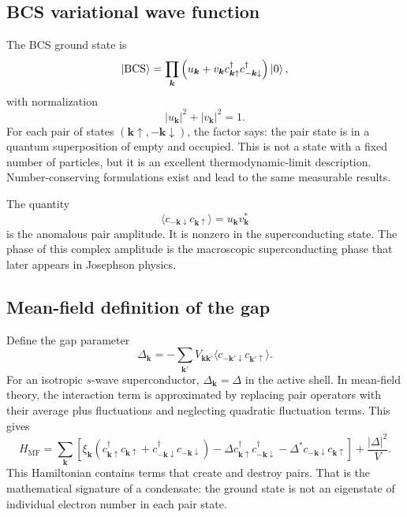 \documentclass[11pt]{article}
\newcommand{\bk}{{\bm{k}}}
\begin{document}
\subsection{BCS variational wave function}
The BCS ground state is
\begin{equation}
\ket{\mathrm{BCS}}=\prod_{\bk}\left(u_\bk+v_\bk c_{\bk\uparrow}^{\dagger}c_{-\bk\downarrow}^{\dagger}\right)\ket{0},
\end{equation}
with normalization
\begin{equation}
 |u_\bk|^2+|v_\bk|^2=1.
\end{equation}
For each pair of states $(\bk\uparrow,-\bk\downarrow)$, the factor says: the pair state is in a quantum superposition of empty and occupied. This is not a state with a fixed number of particles, but it is an excellent thermodynamic-limit description. Number-conserving formulations exist and lead to the same measurable results.

The quantity
\begin{equation}
 \langle c_{-\bk\downarrow}c_{\bk\uparrow}\rangle=u_\bk v_\bk^*
\end{equation}
is the anomalous pair amplitude. It is nonzero in the superconducting state. The phase of this complex amplitude is the macroscopic superconducting phase that later appears in Josephson physics.

\subsection{Mean-field definition of the gap}
Define the gap parameter
\begin{equation}
 \Delta_\bk=-\sum_{\bk'}V_{\bk\bk'}\langle c_{-\bk'\downarrow}c_{\bk'\uparrow}\rangle.
\end{equation}
For an isotropic $s$-wave superconductor, $\Delta_\bk=\Delta$ in the active shell. In mean-field theory, the interaction term is approximated by replacing pair operators with their average plus fluctuations and neglecting quadratic fluctuation terms. This gives
\begin{equation}
H_{\mathrm{MF}}=\sum_{\bk}\left[
\xi_\bk(c_{\bk\uparrow}^{\dagger}c_{\bk\uparrow}+c_{-\bk\downarrow}^{\dagger}c_{-\bk\downarrow})
-\Delta c_{\bk\uparrow}^{\dagger}c_{-\bk\downarrow}^{\dagger}
-\Delta^* c_{-\bk\downarrow}c_{\bk\uparrow}
\right]+\frac{|\Delta|^2}{V}.
\end{equation}
This Hamiltonian contains terms that create and destroy pairs. That is the mathematical signature of a condensate: the ground state is not an eigenstate of individual electron number in each pair state.
\end{document}
